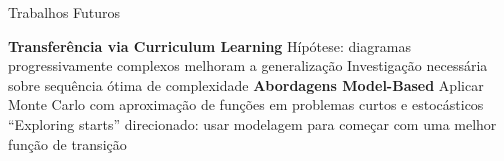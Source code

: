 \documentclass[aspectratio=169]{beamer}
\begin{document}
\begin{frame}{Trabalhos Futuros}
  \begin{outline}
  \1 \textbf{Transferência via Curriculum Learning}
     \2 Hípótese: diagramas progressivamente complexos melhoram a generalização  
     \2 Investigação necessária sobre sequência ótima de complexidade  
  \1 \textbf{Abordagens Model-Based}
     \2 Aplicar Monte Carlo com aproximação de funções em problemas curtos e estocásticos  
     \2 “Exploring starts” direcionado: usar modelagem para começar com uma melhor função de transição 
  \end{outline}
\end{frame}

\begin{frame}[shrink=5]
    \vspace{0.75cm}
    \printbibliography
\end{frame}
\end{document}
